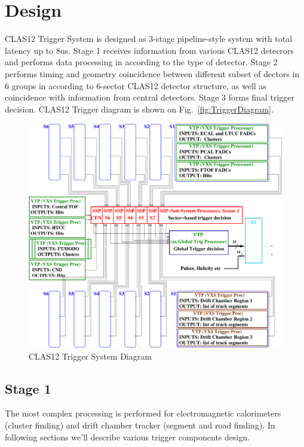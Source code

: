 \section{Design}

CLAS12 Trigger System is designed as 3-stage pipeline-style system with total latency up to 8us. Stage 1 receives information from various CLAS12 detecrors and performs data processing in according to the type of detector. Stage 2 performs timing and geometry coincidence between different subset of dectors in 6 groups in according to 6-sector CLAS12 detector structure, as well as coincidence with information from central detectors. Stage 3 forms final trigger decision.
CLAS12 Trigger diagram is shown on Fig.~\ref{fig:TriggerDiagram}.

\begin{figure}[hbt]
	\centering
	\includegraphics[width=1.0\columnwidth,keepaspectratio]{img/CLAS12_TRIGGER_1.pdf}
	\caption{CLAS12 Trigger System Diagram}
	\label{fig:TtiggerDiagram}
\end{figure}


\subsection{Stage 1} The most complex processing is performed for electromagnetic calorimeters (cluster finding) and drift chamber tracker (segment and road finding). In following sections we'll describe various trigger components design.

